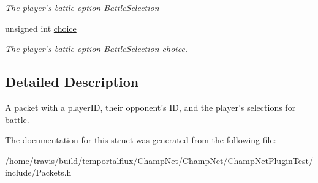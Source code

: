 \begin{DoxyCompactItemize}
\begin{DoxyCompactList}\small\item\em The player's battle option \hyperlink{group__server_ga729fc596fd91937095a8172eb71be582}{Battle\-Selection} \end{DoxyCompactList}\item 
\hypertarget{struct_packet_battle_selection_ad8afea9993a2eb9a31e62d5d321ef80a}{unsigned int \hyperlink{struct_packet_battle_selection_ad8afea9993a2eb9a31e62d5d321ef80a}{choice}}\label{struct_packet_battle_selection_ad8afea9993a2eb9a31e62d5d321ef80a}

\begin{DoxyCompactList}\small\item\em The player's battle option \hyperlink{group__server_ga729fc596fd91937095a8172eb71be582}{Battle\-Selection} choice. \end{DoxyCompactList}\end{DoxyCompactItemize}


\subsection{Detailed Description}
A packet with a player\-I\-D, their opponent's I\-D, and the player's selections for battle. 

The documentation for this struct was generated from the following file\-:\begin{DoxyCompactItemize}
\item 
/home/travis/build/temportalflux/\-Champ\-Net/\-Champ\-Net/\-Champ\-Net\-Plugin\-Test/include/Packets.\-h\end{DoxyCompactItemize}
